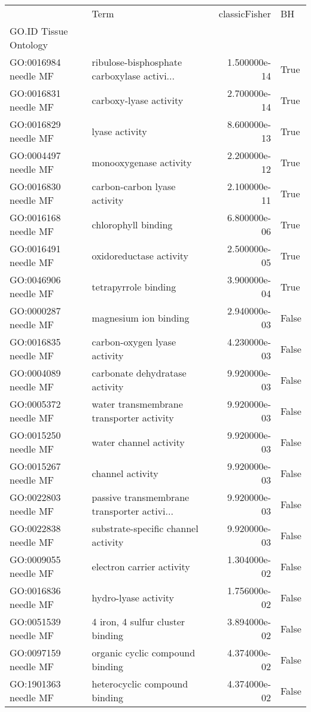 \begin{tabular}{llrl}
\toprule
{} &                                         Term &  classicFisher &     BH \\
GO.ID      Tissue Ontology &                                              &                &        \\
GO:0016984 needle MF       &  ribulose-bisphosphate carboxylase activi... &  1.500000e-14 &  True \\
\midrule
GO:0016831 needle MF       &  carboxy-lyase activity &  2.700000e-14 &  True \\
GO:0016829 needle MF       &  lyase activity &  8.600000e-13 &  True \\
GO:0004497 needle MF       &  monooxygenase activity &  2.200000e-12 &  True \\
GO:0016830 needle MF       &  carbon-carbon lyase activity &  2.100000e-11 &  True \\
GO:0016168 needle MF       &  chlorophyll binding &  6.800000e-06 &  True \\
GO:0016491 needle MF       &  oxidoreductase activity &  2.500000e-05 &  True \\
GO:0046906 needle MF       &  tetrapyrrole binding &  3.900000e-04 &  True \\
GO:0000287 needle MF       &  magnesium ion binding &  2.940000e-03 &  False \\
GO:0016835 needle MF       &  carbon-oxygen lyase activity &  4.230000e-03 &  False \\
GO:0004089 needle MF       &  carbonate dehydratase activity &  9.920000e-03 &  False \\
GO:0005372 needle MF       &  water transmembrane transporter activity &  9.920000e-03 &  False \\
GO:0015250 needle MF       &  water channel activity &  9.920000e-03 &  False \\
GO:0015267 needle MF       &  channel activity &  9.920000e-03 &  False \\
GO:0022803 needle MF       &  passive transmembrane transporter activi... &  9.920000e-03 &  False \\
GO:0022838 needle MF       &  substrate-specific channel activity &  9.920000e-03 &  False \\
GO:0009055 needle MF       &  electron carrier activity &  1.304000e-02 &  False \\
GO:0016836 needle MF       &  hydro-lyase activity &  1.756000e-02 &  False \\
GO:0051539 needle MF       &  4 iron, 4 sulfur cluster binding &  3.894000e-02 &  False \\
GO:0097159 needle MF       &  organic cyclic compound binding &  4.374000e-02 &  False \\
GO:1901363 needle MF       &  heterocyclic compound binding &  4.374000e-02 &  False \\
\bottomrule
\end{tabular}
